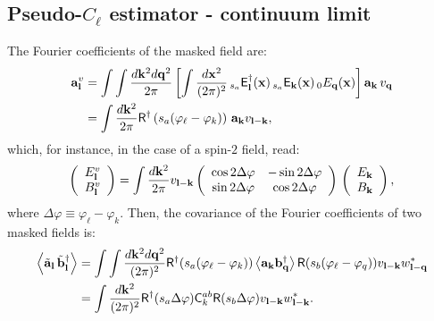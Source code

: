 \documentclass[a4paper,10pt]{article}
\begin{document}
  \subsection{Pseudo-$C_\ell$ estimator - continuum limit}
    The Fourier coefficients of the masked field are:
    \begin{align}
      {\bf a}^v_{\bf l}&=\int\int\frac{d{\bf k}^2d{\bf q}^2}{2\pi}\left[\int\frac{d{\bf x}^2}{(2\pi)^2}\,_{s_a}{\sf E}^\dag_{\bf l}({\bf x})\,_{s_a}{\sf E}_{\bf k}({\bf x})\,_0E_{\bf q}({\bf x})\right]{\bf a}_{\bf k}\,v_{\bf q}\\
                       &=\int\frac{d{\bf k}^2}{2\pi}{\sf R}^\dag\left(s_a(\varphi_\ell-\varphi_k)\right)\,{\bf a}_{\bf k}v_{{\bf l}-{\bf k}},
    \end{align}
    which, for instance, in the case of a spin-$2$ field, read:
    \begin{equation}\label{eq:pseudo_flat_eb}
     \left(
     \begin{array}{c}
      E^v_{\bf l} \\ B^v_{\bf l}
     \end{array}\right)
     =\int\frac{d{\bf k}^2}{2\pi}v_{{\bf l}-{\bf k}}
     \left(
     \begin{array}{cc}
       \cos2\Delta\varphi & -\sin2\Delta\varphi \\
       \sin2\Delta\varphi & \cos2\Delta\varphi
     \end{array}\right)\,\left(
     \begin{array}{c}
      E_{\bf k} \\ B_{\bf k}
     \end{array}\right),
    \end{equation}
    where $\Delta\varphi\equiv\varphi_\ell-\varphi_k$. Then, the covariance of the Fourier coefficients of two masked fields is:
    \begin{align}
      \left\langle\tilde{\bf a}_{\bf l}\,\tilde{\bf b}^\dag_{\bf l}\right\rangle
      &=\int\int\frac{d{\bf k}^2d{\bf q}^2}{(2\pi)^2}{\sf R}^\dag(s_a(\varphi_\ell-\varphi_k))\left\langle{\bf a}_{\bf k}{\bf b}^\dag_{\bf q}\right\rangle{\sf R}(s_b(\varphi_\ell-\varphi_q))v_{{\bf l}-{\bf k}}w^*_{{\bf l}-{\bf q}}\\
      &=\int\frac{d{\bf k}^2}{(2\pi)^2}{\sf R}^\dag(s_a\Delta\varphi){\sf C}^{ab}_k{\sf R}(s_b\Delta\varphi)v_{{\bf l}-{\bf k}}w^*_{{\bf l}-{\bf k}}.
    \end{align}
    
\end{document}
